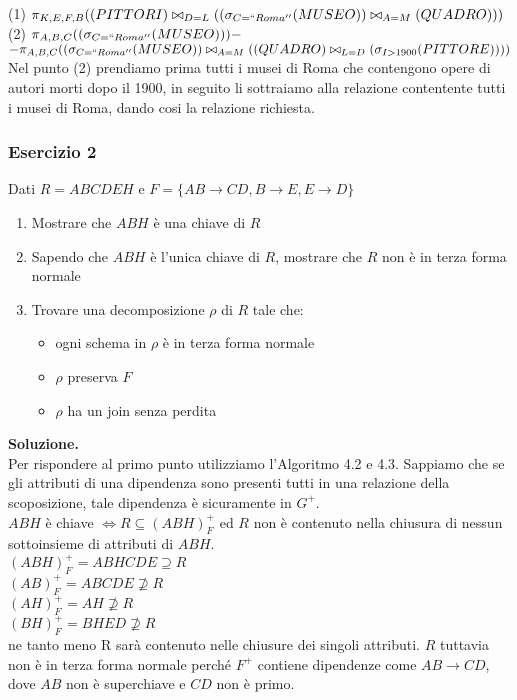  \noindent(1) $\pi_{K, E, F, B}((PITTORI)\bowtie_{D=L}((\sigma_{C=``Roma''}(MUSEO))\bowtie_{A=M}(QUADRO)))$\\
 (2) $\pi_{A,B,C}((\sigma_{C=``Roma''}(MUSEO))) - $\\ $ - \pi_{A,B,C}((\sigma_{C=``Roma''}(MUSEO))\bowtie_{A=M}((QUADRO)\bowtie_{L=D}(\sigma_{I>1900}(PITTORE))))$\\
  
  Nel punto (2) prendiamo prima tutti i musei di Roma che contengono opere di autori morti dopo il 1900, in seguito li 
  sottraiamo alla relazione contentente tutti i musei di Roma, dando cosi la relazione richiesta.
  \subsubsection{Esercizio 2}
   Dati $R=ABCDEH$ e $F=\{AB\rightarrow CD, B\rightarrow E, E\rightarrow D\}$

 \begin{enumerate}
  \item Mostrare che $ABH$ è una chiave di $R$
  \item Sapendo che $ABH$ è l’unica chiave di $R$, mostrare che $R$ non è in terza forma normale
  \item Trovare una decomposizione $\rho$ di $R$ tale che:
   \begin{itemize}
    \item ogni schema in $\rho$ è in terza forma normale
    \item $\rho$ preserva $F$
    \item $\rho$ ha un join senza perdita
   \end{itemize}
 \end{enumerate}

 \noindent\textbf{\fontsize{14pt}{1em}Soluzione.}\\
 Per rispondere al primo punto utilizziamo l'Algoritmo 4.2 e 4.3. Sappiamo che se gli attributi di una dipendenza sono presenti
 tutti in una relazione della scoposizione, tale dipendenza è sicuramente in $G^+$.\\
 
 \noindent$ABH$ è chiave $\Leftrightarrow R\subseteq (ABH)^+_F$ ed $R$ non è contenuto nella chiusura di nessun sottoinsieme di
 attributi di $ABH$.\\
 $(ABH)^+_F= ABHCDE \supseteq R$\\
 $(AB)^+_F = ABCDE \not\supseteq R$\\
 $(AH)^+_F = AH \not\supseteq R$\\
 $(BH)^+_F= BHED \not\supseteq R$\\
 ne tanto meno R sarà contenuto nelle chiusure dei singoli attributi. $R$ tuttavia non è in terza forma normale perché $F^+$ 
 contiene dipendenze come $AB\rightarrow CD$, dove $AB$ non è superchiave e $CD$ non è primo.\\
 
